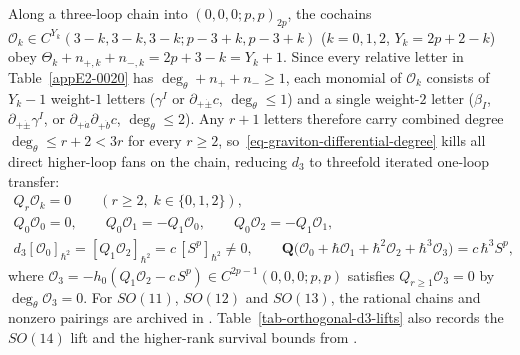 \documentclass[11pt]{article}
\numberwithin{equation}{section}
\numberwithin{figure}{section}
\numberwithin{table}{section}
\begin{document}
Along a three-loop chain into $(0,0,0;p,p)_{2p}$, the cochains $\mathcal O_k\in C^{Y_k}(3-k,3-k,3-k;p-3+k,p-3+k)$ ($k=0,1,2$, $Y_k=2p+2-k$) obey $\Theta_k+n_{+,k}+n_{-,k}=2p+3-k=Y_k+1$. Since every relative letter in Table~\ref{appE2-0020} has $\deg_\theta+n_++n_-\ge1$, each monomial of $\mathcal O_k$ consists of $Y_k-1$ weight-$1$ letters ($\gamma^I$ or $\partial_{+\dot\pm}c$, $\deg_\theta\le1$) and a single weight-$2$ letter ($\beta_I$, $\partial_{+\dot\pm}\gamma^I$, or $\partial_{+\dot a}\partial_{+\dot b}c$, $\deg_\theta\le2$). Any $r+1$ letters therefore carry combined degree $\deg_\theta\le r+2<3r$ for every $r\ge2$, so~\eqref{eq-graviton-differential-degree} kills all direct higher-loop fans on the chain, reducing $d_3$ to threefold iterated one-loop transfer:
\begin{equation}\label{eq-orthogonal-d3-chain}
\begin{gathered}
Q_r\mathcal O_k=0\qquad(r\ge2,\;k\in\{0,1,2\}),\\
Q_0\mathcal O_0=0,\qquad Q_0\mathcal O_1=-Q_1\mathcal O_0,\qquad Q_0\mathcal O_2=-Q_1\mathcal O_1,\\
d_3[\mathcal O_0]_{\hbar^2}=[Q_1\mathcal O_2]_{\hbar^2}=c\,[S^p]_{\hbar^2}\ne0,
\qquad
\mathbf Q\bigl(\mathcal O_0+\hbar\mathcal O_1+\hbar^2\mathcal O_2+\hbar^3\mathcal O_3\bigr)=c\,\hbar^3 S^p,
\end{gathered}
\end{equation}
where $\mathcal O_3=-h_0(Q_1\mathcal O_2-c\,S^p)\in C^{2p-1}(0,0,0;p,p)$ satisfies $Q_{r\ge1}\mathcal O_3=0$ by $\deg_\theta\mathcal O_3=0$. For $SO(11)$, $SO(12)$ and $SO(13)$, the rational chains and nonzero pairings are archived in \cite{Repo}. Table~\ref{tab-orthogonal-d3-lifts} also records the $SO(14)$ lift and the higher-rank survival bounds from \cite{Repo}.
\end{document}

